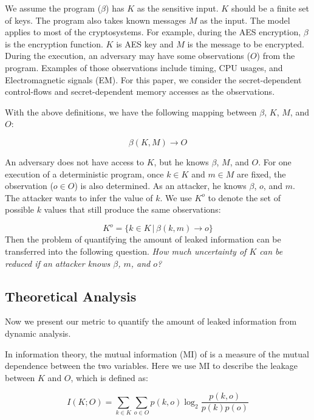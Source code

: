 We assume the program ($\beta$) has $K$ as the sensitive input. 
$K$ should be a finite set of keys. The program also takes known messages $M$ as the input. 
The model applies to most of the cryptosystems. For example,
during the AES encryption, $\beta$ is the encryption function. $K$ is AES key and
$M$ is the message to be encrypted. During the execution, an adversary may have some observations ($O$) from the program. Examples of those observations
include timing, CPU usages, and Electromagnetic signals (EM). For this paper, we
consider the secret-dependent control-flows and secret-dependent memory accesses
as the observations.

With the above definitions, we have the following mapping between $\beta$, $K$, $M$, and $O$:

\begin{displaymath}
    \beta(K, M) \rightarrow O
\end{displaymath}

An adversary does not have access to $K$, but he knows $\beta$, $M$, and $O$. 
For one execution of a deterministic program, once $k \in K$ and $m \in M$ are fixed, the 
observation ($o \in O$) is also determined. As an attacker, he knows $\beta$, $o$, 
and $m$. The attacker wants to infer the value of $k$. We use $K^o$ to denote the set of
possible $k$ values that still produce the same observations:

\begin{displaymath}
    K^o = \{ k \in K \, |\, \beta(k, m) \rightarrow o\}
\end{displaymath}
Then the problem of quantifying the amount of leaked information can be transferred into the
following question. 
\emph{How much uncertainty of $K$ can be reduced if an attacker knows $\beta$, $m$, and $o$?}
 
\subsection{Theoretical Analysis}
Now we present our metric to quantify the amount of leaked 
information from dynamic analysis.

In information theory, the mutual information (MI) of is a measure of the mutual dependence 
between the two variables. Here we use MI to describe the leakage between $K$ and $O$, 
which is defined as:

\begin{equation} \label{eq:1}
    I(K;O) = \sum_{k {\in} K}{\sum_{o {\in} O}{p(k, o)\log_2\frac{p(k, o)}{p(k)p(o)}}}
\end{equation}

